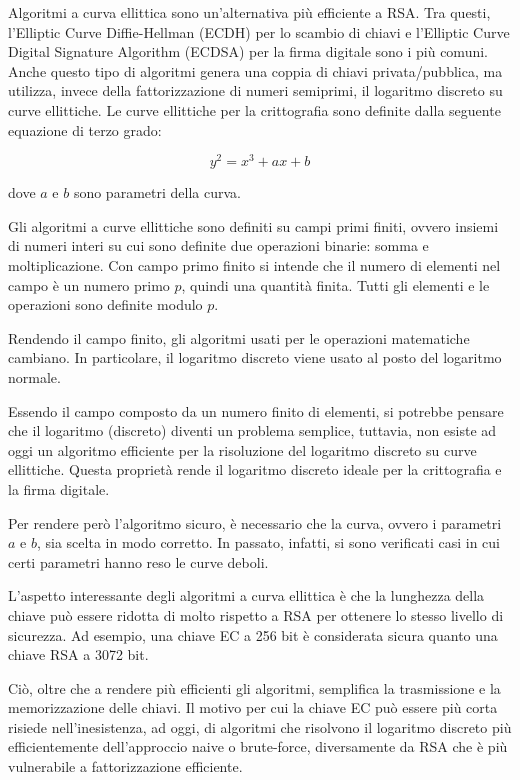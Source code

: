 \documentclass{article}
\begin{document}
Algoritmi a curva ellittica sono un'alternativa più efficiente a RSA.
Tra questi, l'Elliptic Curve Diffie-Hellman (ECDH) per lo scambio di chiavi e l'Elliptic Curve Digital Signature Algorithm (ECDSA) per la firma digitale sono i più comuni.
Anche questo tipo di algoritmi genera una coppia di chiavi privata/pubblica, ma utilizza, invece della fattorizzazione di numeri semiprimi, il logaritmo discreto su curve ellittiche.
Le curve ellittiche per la crittografia sono definite dalla seguente equazione di terzo grado:

$$y^2 = x^3 + ax + b$$

dove $a$ e $b$ sono parametri della curva.

Gli algoritmi a curve ellittiche sono definiti su campi primi finiti, ovvero insiemi di numeri interi su cui sono definite due operazioni binarie: somma e moltiplicazione.
Con campo primo finito si intende che il numero di elementi nel campo è un numero primo $p$, quindi una quantità finita. Tutti gli elementi e le operazioni sono definite modulo $p$.

Rendendo il campo finito, gli algoritmi usati per le operazioni matematiche cambiano.
In particolare, il logaritmo discreto viene usato al posto del logaritmo normale.

Essendo il campo composto da un numero finito di elementi, si potrebbe pensare che il logaritmo (discreto) diventi un problema semplice, tuttavia, non esiste ad oggi un algoritmo efficiente per la risoluzione del logaritmo discreto su curve ellittiche.
Questa proprietà rende il logaritmo discreto ideale per la crittografia e la firma digitale.

Per rendere però l'algoritmo sicuro, è necessario che la curva, ovvero i parametri $a$ e $b$, sia scelta in modo corretto. In passato, infatti, si sono verificati casi in cui certi parametri hanno reso le curve deboli.

L'aspetto interessante degli algoritmi a curva ellittica è che la lunghezza della chiave può essere ridotta di molto rispetto a RSA per ottenere lo stesso livello di sicurezza.
Ad esempio, una chiave EC a 256 bit è considerata sicura quanto una chiave RSA a 3072 bit.

Ciò, oltre che a rendere più efficienti gli algoritmi, semplifica la trasmissione e la memorizzazione delle chiavi.
Il motivo per cui la chiave EC può essere più corta risiede nell'inesistenza, ad oggi, di algoritmi che risolvono il logaritmo discreto più efficientemente dell'approccio naive o brute-force, diversamente da RSA che è più vulnerabile a fattorizzazione efficiente.
\end{document}
